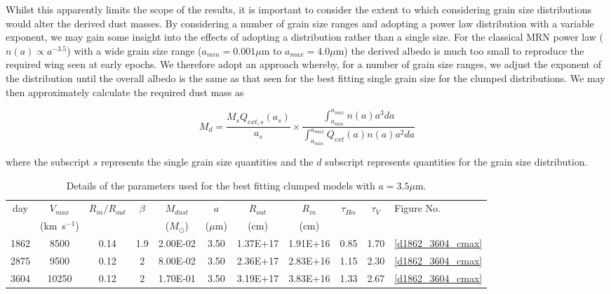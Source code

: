 \documentclass[useAMS,usenatbib,usegraphicx]{mnras}
\begin{document}
Whilst this apparently limits the scope of the results, it is important to consider the extent to which considering grain size distributions would alter the derived dust masses.  By considering a number of grain size ranges and adopting a power law distribution with a variable exponent, we may gain some insight into the effects of adopting a distribution rather than a single size.  For the classical MRN power law ($n(a) \propto a^{-3.5}$) with a wide grain size range ($a_{min} = 0.001 \mu$m to $a_{max} = 4.0 \mu$m) the derived albedo is much too small to reproduce the required wing seen at early epochs.  We therefore adopt an approach whereby, for a number of grain size ranges, we adjust the exponent of the distribution until the overall albedo is the same as that seen for the best fitting single grain size for the clumped distributions.  We may then approximately calculate the required dust mass as

\begin{equation}
\label{distn_conv}
M_{d}= \frac{M_s Q_{ext,s}(a_s)}{a_s} \times \frac{\int^{a_{max}}_{a_{min}} n(a) a^3 da}{\int^{a_{max}}_{a_{min}} Q_{ext}(a) n(a) a^2 da}
\end{equation}

where the subscript $s$ represents the single grain size quantities and the $d$ subscript represents quantities for the grain size distribution.  



\begin{table}
	\begin{minipage}{180mm}
	\caption{Details of the parameters used for the best fitting clumped models with $a=3.5\mu$m.}
	\label{clumped2}
	\begin{center}
  	\begin{tabular}{@{} ccccccccccl @{}}
    	\hline
  day & $V_{max}$ & $R_{in}/R_{out}$ & $\beta$ & $M_{dust}$ & $a$ & $R_{out}$ & $R_{in}$ & $\tau_{H\alpha}$ & $\tau_V$ & Figure No. \\
	& (km~s$^{-1} $) & & & ($M_{\odot}$) & ($\mu$m) & (cm) & (cm)  \\
	\hline
1862 & 8500 & 0.14 & 1.9 & 2.00E-02 & 3.50 & 1.37E+17 & 1.91E+16 & 0.85 & 1.70 & \ref{d1862_3604_cmax} \\
2875 & 9500 & 0.12 & 2 & 8.00E-02 & 3.50 & 2.36E+17 & 2.83E+16 & 1.15 & 2.30 & \ref{d1862_3604_cmax} \\
3604 & 10250 & 0.12 & 2 & 1.70E-01 & 3.50 & 3.19E+17 & 3.83E+16 & 1.33 & 2.67 & \ref{d1862_3604_cmax} \\
    \hline
  \end{tabular}
  \end{center}
\end{minipage}
\end{table}
\end{document}
